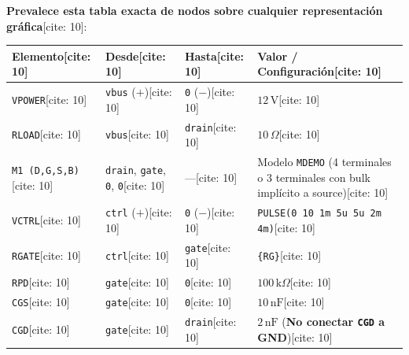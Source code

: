 \documentclass[11pt, a4paper]{article}
\begin{document}
\noindent\textbf{Prevalece esta tabla exacta de nodos sobre cualquier representación gráfica}[cite: 10]:

\vspace{0.15cm}
\noindent
\begin{tabularx}{\textwidth}{@{} l l l >{\raggedright\arraybackslash}X @{}}
\toprule
\textbf{Elemento}[cite: 10] & \textbf{Desde}[cite: 10] & \textbf{Hasta}[cite: 10] & \textbf{Valor / Configuración}[cite: 10] \\ \midrule
\texttt{VPOWER}[cite: 10] & \texttt{vbus} ($+$)[cite: 10] & \texttt{0} ($-$)[cite: 10] & $12\,\text{V}$[cite: 10] \\
\texttt{RLOAD}[cite: 10] & \texttt{vbus}[cite: 10] & \texttt{drain}[cite: 10] & $10\,\Omega$[cite: 10] \\
\texttt{M1 (D,G,S,B)}[cite: 10] & \texttt{drain}, \texttt{gate}, \texttt{0}, \texttt{0}[cite: 10] & —[cite: 10] & Modelo \texttt{MDEMO} (4 terminales o 3 terminales con bulk implícito a source)[cite: 10] \\
\texttt{VCTRL}[cite: 10] & \texttt{ctrl} ($+$)[cite: 10] & \texttt{0} ($-$)[cite: 10] & \texttt{PULSE(0 10 1m 5u 5u 2m 4m)}[cite: 10] \\
\texttt{RGATE}[cite: 10] & \texttt{ctrl}[cite: 10] & \texttt{gate}[cite: 10] & \texttt{\{RG\}}[cite: 10] \\
\texttt{RPD}[cite: 10] & \texttt{gate}[cite: 10] & \texttt{0}[cite: 10] & $100\,\text{k}\Omega$[cite: 10] \\
\texttt{CGS}[cite: 10] & \texttt{gate}[cite: 10] & \texttt{0}[cite: 10] & $10\,\text{nF}$[cite: 10] \\
\texttt{CGD}[cite: 10] & \texttt{gate}[cite: 10] & \texttt{drain}[cite: 10] & $2\,\text{nF}$ (\textbf{No conectar \texttt{CGD} a GND})[cite: 10] \\ \bottomrule
\end{tabularx}

\newpage
\end{document}
